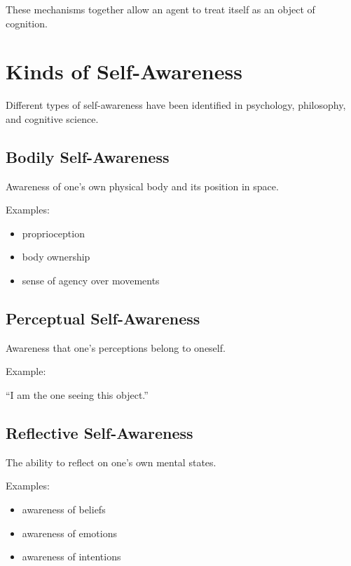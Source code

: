 \documentclass{article}
\begin{document}
      These mechanisms together allow an agent to treat itself as an object of cognition.


   \section{Kinds of Self-Awareness}

      Different types of self-awareness have been identified in psychology, philosophy, and cognitive science.

      \subsection{Bodily Self-Awareness}

         Awareness of one's own physical body and its position in space.

         Examples:
         \begin{itemize}
            \item proprioception
            \item body ownership
            \item sense of agency over movements
         \end{itemize}

      \subsection{Perceptual Self-Awareness}

         Awareness that one's perceptions belong to oneself.

         Example:

         ``I am the one seeing this object.''

      \subsection{Reflective Self-Awareness}

         The ability to reflect on one's own mental states.

         Examples:

         \begin{itemize}
            \item awareness of beliefs
            \item awareness of emotions
            \item awareness of intentions
         \end{itemize}
\end{document}
